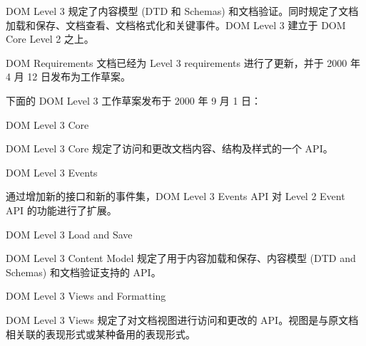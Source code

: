 DOM Level 3 规定了内容模型 (DTD 和 Schemas) 和文档验证。同时规定了文档加载和保存、文档查看、文档格式化和关键事件。DOM Level 3 建立于 DOM Core Level 2 之上。

DOM Requirements 文档已经为 Level 3 requirements 进行了更新，并于 2000 年 4 月 12 日发布为工作草案。


下面的 DOM Level 3 工作草案发布于 2000 年 9 月 1 日：

\begin{compactitem}
\item DOM Level 3 Core

DOM Level 3 Core 规定了访问和更改文档内容、结构及样式的一个 API。

\item DOM Level 3 Events

通过增加新的接口和新的事件集，DOM Level 3 Events API 对 Level 2 Event API 的功能进行了扩展。

\item DOM Level 3 Load and Save

DOM Level 3 Content Model 规定了用于内容加载和保存、内容模型 (DTD and Schemas) 和文档验证支持的 API。

\item DOM Level 3 Views and Formatting

DOM Level 3 Views 规定了对文档视图进行访问和更改的 API。视图是与原文档相关联的表现形式或某种备用的表现形式。

\end{compactitem}

